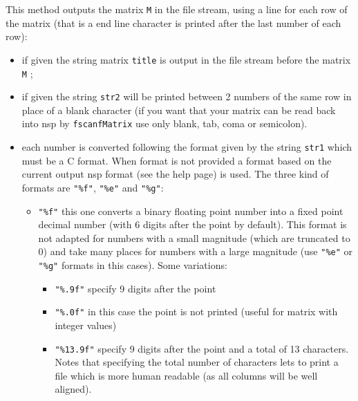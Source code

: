   This method outputs the matrix \verb+M+ in the file stream, using a line for each 
row of the matrix (that is a end line character is printed after the last number of
each row):

\begin{itemize}

\item {} if given the string matrix \verb+title+ is output in the
file stream before the matrix \verb+M+ ; 

\item {} if given the string \verb+str2+ will be printed between
2 numbers of the same row in place of a blank character (if you want that your
matrix can be read back into nsp by \verb+fscanfMatrix+ use only blank, tab, coma 
or semicolon).

\item {} each number is converted following the format 
given by the string  \verb+str1+ which must be a C format. When format is not
provided a format based on the current output nsp format (see the 
 help page) is used. The three kind of formats are  
\verb+"%f"+,  \verb+"%e"+ and  \verb+"%g"+:
\begin{itemize}
\item \verb+"%f"+ this one converts a binary floating point number into a fixed
point decimal number (with 6 digits after the point by default). This format is not 
adapted for numbers with a small magnitude (which are truncated to 0) and take many 
places for numbers with a large magnitude (use \verb+"%e"+ or   \verb+"%g"+ formats
in this cases). Some variations:
\begin{itemize}
\item  \verb+"%.9f"+ specify 9 digits after the point
\item  \verb+"%.0f"+ in this case the point is not printed (useful for matrix with 
integer values)
\item  \verb+"%13.9f"+ specify 9 digits after the point and a total of 13 characters.
Notes that specifying the total number of characters lets to print
a file which is more human readable (as all columns will be well aligned).
\end{itemize}


\end{itemize}
\end{itemize}
